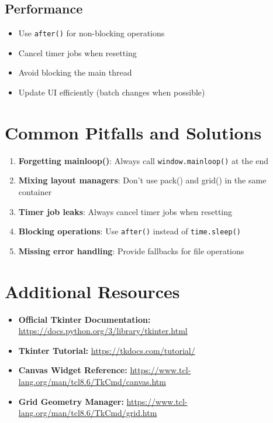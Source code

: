 \documentclass[12pt,a4paper]{article}
\begin{document}
\subsection{Performance}
\begin{itemize}
    \item Use \texttt{after()} for non-blocking operations
    \item Cancel timer jobs when resetting
    \item Avoid blocking the main thread
    \item Update UI efficiently (batch changes when possible)
\end{itemize}

\section{Common Pitfalls and Solutions}

\begin{enumerate}
    \item \textbf{Forgetting mainloop()}: Always call \texttt{window.mainloop()} at the end
    \item \textbf{Mixing layout managers}: Don't use pack() and grid() in the same container
    \item \textbf{Timer job leaks}: Always cancel timer jobs when resetting
    \item \textbf{Blocking operations}: Use \texttt{after()} instead of \texttt{time.sleep()}
    \item \textbf{Missing error handling}: Provide fallbacks for file operations
\end{enumerate}

\section{Additional Resources}

\begin{itemize}
    \item \textbf{Official Tkinter Documentation:} \url{https://docs.python.org/3/library/tkinter.html}
    \item \textbf{Tkinter Tutorial:} \url{https://tkdocs.com/tutorial/}
    \item \textbf{Canvas Widget Reference:} \url{https://www.tcl-lang.org/man/tcl8.6/TkCmd/canvas.htm}
    \item \textbf{Grid Geometry Manager:} \url{https://www.tcl-lang.org/man/tcl8.6/TkCmd/grid.htm}
\end{itemize}
\end{document}
